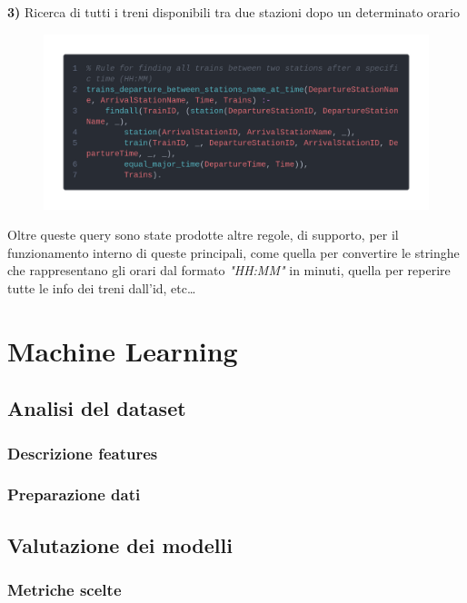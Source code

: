 \documentclass[italian,12pt,a4paper]{article}
\begin{document}
	\textbf{3)} Ricerca di tutti i treni disponibili tra due stazioni dopo un determinato orario
	\begin{figure}[!h]
		\centering
		\includegraphics[width=1.1\linewidth]{img/code4}
	\end{figure}
\linebreak
	Oltre queste query sono state prodotte altre regole, di supporto, per il funzionamento interno di queste principali, come quella per convertire le stringhe che rappresentano gli orari dal formato \textit{"HH:MM"} in minuti, quella per reperire tutte le info dei treni dall'id, etc\dots

	\section{Machine Learning}

	\subsection{Analisi del dataset}
	
	\subsubsection{Descrizione features}

	
	\subsubsection{Preparazione dati}
	
	
	\subsection{Valutazione dei modelli}

	
	\subsubsection{Metriche scelte}
\end{document}
